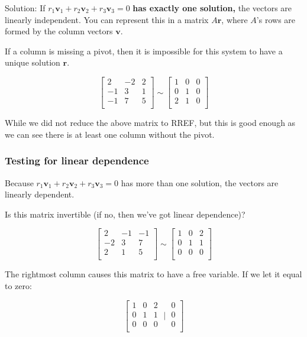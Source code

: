 \documentclass[
]{article}
\begin{document}
Solution: If
$r_{1}{\mathbf{v}}_{1} + r_{2}{\mathbf{v}}_{2} + r_{3}{\mathbf{v}}_{3} = 0$
\textbf{has exactly one solution,} the vectors are linearly independent.
You can represent this in a matrix $A\mathbf{r}$, where $A$'s
rows are formed by the column vectors $\mathbf{v}$.

If a column is missing a pivot, then it is impossible for this system to
have a unique solution $\mathbf{r}$.

$$\begin{bmatrix}
2 & - 2 & 2 \\
 - 1 & 3 & 1 \\
 - 1 & 7 & 5 \\
\end{bmatrix}\sim\begin{bmatrix}
1 & 0 & 0 \\
0 & 1 & 0 \\
2 & 1 & 0 \\
\end{bmatrix}$$

While we did not reduce the above matrix to RREF, but this is good
enough as we can see there is at least one column without the pivot.


\subsubsection{Testing for linear
dependence}

Because
$r_{1}{\mathbf{v}}_{1} + r_{2}{\mathbf{v}}_{2} + r_{3}{\mathbf{v}}_{3} = 0$
has more than one solution, the vectors are linearly dependent.

Is this matrix invertible (if no, then we've got linear dependence)?

$$\begin{bmatrix}
2 & - 1 & - 1 \\
 - 2 & 3 & 7 \\
2 & 1 & 5 \\
\end{bmatrix}\sim\begin{bmatrix}
1 & 0 & 2 \\
0 & 1 & 1 \\
0 & 0 & 0 \\
\end{bmatrix}$$

The rightmost column causes this matrix to have a free variable. If we
let it equal to zero:

$$\left\lbrack \begin{matrix}
1 & 0 & 2 \\
0 & 1 & 1 \\
0 & 0 & 0 \\
\end{matrix}\mid\begin{matrix}
0 \\
0 \\
0 \\
\end{matrix} \right\rbrack$$
\end{document}

